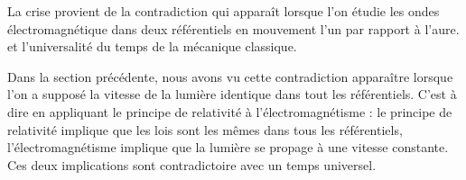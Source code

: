 La crise provient de la contradiction qui apparaît lorsque l'on étudie les ondes électromagnétique dans deux référentiels en mouvement l'un par rapport à l'aure. et l'universalité du temps de la mécanique classique.


Dans la section précédente, nous avons vu cette contradiction apparaître lorsque l'on a supposé la vitesse de la lumière identique dans tout les référentiels. C'est à dire en appliquant le principe de relativité à l'électromagnétisme : le principe de relativité implique que les lois sont les mêmes dans tous les référentiels, l'électromagnétisme implique que la lumière se propage à une vitesse constante. Ces deux implications sont contradictoire avec un temps universel.





